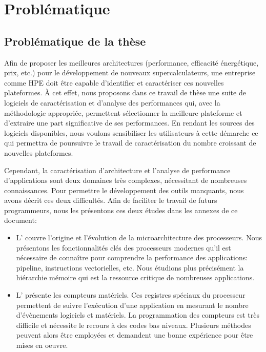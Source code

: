 \section{Problématique}
         
         
    \subsection{Problématique de la thèse}
    
        Afin de proposer les meilleures architectures (performance, efficacité énergétique, prix, etc.) pour le développement de nouveaux supercalculateurs, une entreprise comme HPE doit être capable d'identifier et caractériser ces nouvelles plateformes. À cet effet, nous proposons dans ce travail de thèse une suite de logiciels de caractérisation et d'analyse des performances qui, avec la méthodologie appropriée, permettent sélectionner la meilleure plateforme et d'extraire une part significative de ses performances. En rendant les sources des logiciels disponibles, nous voulons sensibiliser les utilisateurs à cette démarche ce qui permettra de poursuivre le travail de caractérisation du nombre croissant de nouvelles plateformes.
 
        Cependant, la caractérisation d'architecture et l'analyse de performance d'applications sont deux domaines très complexes, nécessitant de nombreuses connaissances. Pour permettre le développement des outils manquants, nous avons décrit ces deux difficultés. Afin de faciliter le travail de futurs programmeurs, nous les présentons ces deux études dans les annexes de ce document:
        \begin{itemize}
            \item L' couvre l'origine et l'évolution de la microarchitecture des processeurs. Nous présentons les fonctionnalités clés des processeurs modernes qu'il est nécessaire de connaître pour comprendre la performance des applications: pipeline, instructions vectorielles, etc. Nous étudions plus précisément la hiérarchie mémoire qui est la ressource critique de nombreuses applications. 
            
            \item L' présente les compteurs matériels. Ces registres spéciaux du processeur permettent de suivre l'exécution d'une application en mesurant le nombre d'évènements logiciels et matériels. La programmation des compteurs est très difficile et nécessite le recours à des codes bas niveaux. Plusieurs méthodes peuvent alors être employées et demandent une bonne expérience pour être mises en oeuvre.
        \end{itemize}


